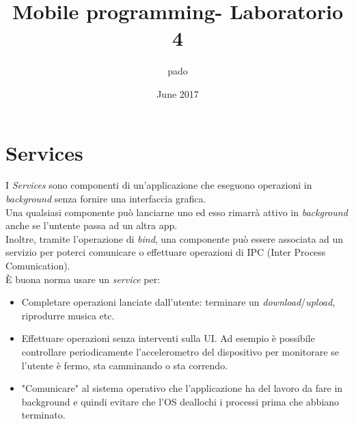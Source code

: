 \documentclass{book}
\title{Mobile programming- Laboratorio 4}
\author{pado}
\date{June 2017}
\begin{document}
\maketitle

\chapter{Services}

I \textit{Services} sono componenti di un'applicazione che eseguono operazioni in \textit{background} senza fornire una interfaccia grafica. \\
Una qualsiasi componente può lanciarne uno ed esso rimarrà attivo in \textit{background} anche se l'untente passa ad un altra app.\\
Inoltre, tramite l'operazione di \textit{bind}, una componente può essere associata ad un servizio per poterci comunicare o effettuare operazioni di IPC (Inter Process Comunication).\\
È buona norma usare un \textit{service} per:
\begin{itemize}
	\item Completare operazioni lanciate dall'utente: terminare un \textit{download}/\textit{upload}, riprodurre musica etc.
	\item Effettuare operazioni senza interventi sulla UI. Ad esempio è possibile controllare periodicamente l'accelerometro del dispositivo per monitorare se l'utente è fermo, sta camminando o sta correndo.
	\item "Comunicare" al sistema operativo che l'applicazione ha del lavoro da fare in background e quindi evitare che l'OS deallochi i processi prima che abbiano terminato.
\end{itemize}
\end{document}

